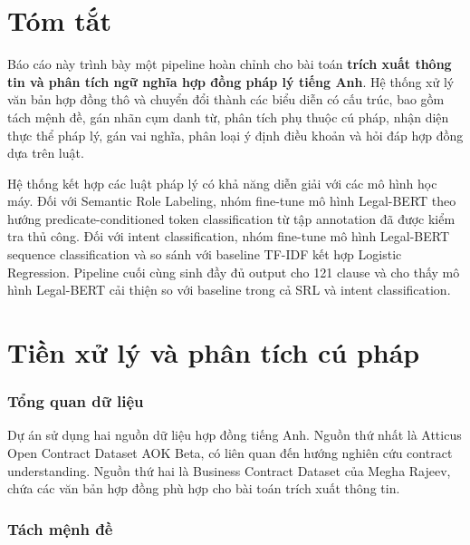 \documentclass[oneside,final]{hcmut-report}
\begin{document}
\fancyfoot{}
\coverpage\clearpage


\tableofcontents
\thispagestyle{fancy}
\clearpage

\setcounter{page}{1}

\part*{Tóm tắt}
Báo cáo này trình bày một pipeline hoàn chỉnh cho bài toán \textbf{trích xuất thông tin và phân tích ngữ nghĩa hợp đồng pháp lý tiếng Anh}. Hệ thống xử lý văn bản hợp đồng thô và chuyển đổi thành các biểu diễn có cấu trúc, bao gồm tách mệnh đề, gán nhãn cụm danh từ, phân tích phụ thuộc cú pháp, nhận diện thực thể pháp lý, gán vai nghĩa, phân loại ý định điều khoản và hỏi đáp hợp đồng dựa trên luật.

Hệ thống kết hợp các luật pháp lý có khả năng diễn giải với các mô hình học máy. Đối với Semantic Role Labeling, nhóm fine-tune mô hình Legal-BERT theo hướng predicate-conditioned token classification từ tập annotation đã được kiểm tra thủ công. Đối với intent classification, nhóm fine-tune mô hình Legal-BERT sequence classification và so sánh với baseline TF-IDF kết hợp Logistic Regression. Pipeline cuối cùng sinh đầy đủ output cho 121 clause và cho thấy mô hình Legal-BERT cải thiện so với baseline trong cả SRL và intent classification.
\clearpage

\part{Tiền xử lý và phân tích cú pháp}
\label{assignment_1}

\section{Tổng quan dữ liệu}

Dự án sử dụng hai nguồn dữ liệu hợp đồng tiếng Anh. Nguồn thứ nhất là Atticus Open Contract Dataset AOK Beta, có liên quan đến hướng nghiên cứu contract understanding. Nguồn thứ hai là Business Contract Dataset của Megha Rajeev, chứa các văn bản hợp đồng phù hợp cho bài toán trích xuất thông tin.

\section{Tách mệnh đề}
\label{task_1.1}
\end{document}
